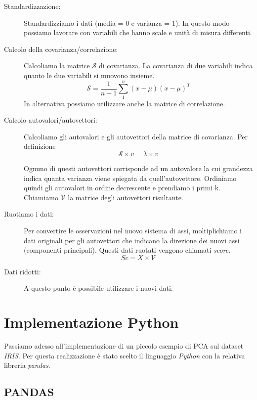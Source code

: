 \documentclass[12pt]{article}
\begin{document}
		\begin{description}
			\item[Standardizzazione:] Standardizziamo i dati (media = 0 e varianza = 1). In questo modo possiamo lavorare con variabili che hanno scale e unità di misura differenti.
			\item[Calcolo della covarianza/correlazione:] Calcoliamo la matrice $\mathcal{S}$ di covarianza. La covarianza di due variabili indica quanto le due variabili si muovono insieme.
			$$\mathcal{S} = \frac{1}{n-1} \sum_{1}^{n} (x-\mu)(x-\mu)^T$$
			In alternativa possiamo utilizzare anche la matrice di correlazione.
			\item[Calcolo autovalori/autovettori:] Calcoliamo gli autovalori e gli autovettori della matrice di covarianza. Per definizione $$\mathcal{S} \times v = \lambda \times v$$
			
			Ognuno di questi autovettori corrisponde ad un autovalore la cui grandezza indica quanta varianza viene spiegata da quell'autovettore. Ordiniamo quindi gli autovalori in ordine decrescente e prendiamo i primi k. Chiamiamo $\mathcal{V}$ la matrice degli autovettori risultante.
			\item[Ruotiamo i dati:] Per convertire le osservazioni nel nuovo sistema di assi, moltiplichiamo i dati originali per gli autovettori che indicano la direzione dei nuovi assi (componenti principali). Questi dati ruotati vengono chiamati \emph{score}. $$Sc = X \times \mathcal{V}$$
			\item[Dati ridotti:] A questo punto è possibile utilizzare i nuovi dati.
		\end{description}
	
\section{Implementazione Python}

	Passiamo adesso all'implementazione di un piccolo esempio di \ac{PCA} sul dataset \emph{IRIS}. Per questa realizzazione è stato scelto il linguaggio \emph{Python} con la relativa libreria \emph{pandas}.

	\subsection{PANDAS}
\end{document}
